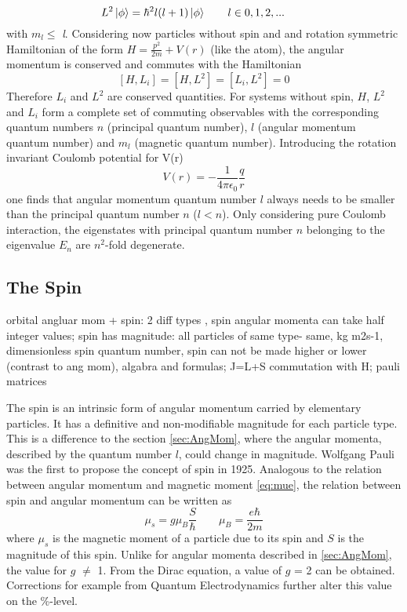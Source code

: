 \begin{equation}
\label{eq:l}
 L^{2}\ket{\phi}=\hbar^{2}l(l+1)\ket{\phi} \hspace{2em} l\in{0,1,2,...} \hspace{2em}
\end{equation} 
with \textbar\textit{$m_{l}$}\textbar $\leq$ \textit{l}. Considering now particles without spin and and rotation symmetric Hamiltonian of the form $H=\frac{p^{2}}{2m}+V(r)$ (like the atom), the angular momentum is conserved and commutes with the Hamiltonian
\begin{equation}
\label{eq:commutatorL3}
 [H,L_{i}]=[H,L^{2}]=[L_{i},L^{2}]=0
\end{equation} 
Therefore $L_{i}$ and $L^{2}$ are conserved quantities. For systems without spin, $H$, $L^{2}$ and $L_{i}$ form a complete set of commuting observables with the corresponding quantum numbers $n$ (principal quantum number), $l$ (angular momentum quantum number) and $m_{l}$ (magnetic quantum number). Introducing the rotation invariant Coulomb potential for V(r)
\begin{equation}
 V(r)=-\frac{1}{4\pi\epsilon_{0}}\frac{q}{r}
\end{equation} 
one finds that angular momentum quantum number $l$ always needs to be smaller than the principal quantum number $n$ ($l<n$). Only considering pure Coulomb interaction, the eigenstates with principal quantum number $n$ belonging to the eigenvalue $E_{n}$ are $n^{2}$-fold degenerate.
 
\subsection{The Spin}
\label{sec:Spin}

orbital angluar mom + spin: 2 diff types , spin angular momenta can take half integer values; spin has magnitude: all particles of same type- same, kg m2s-1, dimensionless spin quantum number, spin can not be made higher or lower (contrast to ang mom), algabra and formulas; J=L+S commutation with H; pauli matrices

The spin is an intrinsic form of angular momentum carried by elementary particles. It has a definitive and non-modifiable magnitude for each particle type. This is a difference to the section \ref{sec:AngMom}, where the angular momenta, described by the quantum number $l$, could change in magnitude. Wolfgang Pauli was the first to propose the concept of spin in 1925. Analogous to the relation between angular momentum and magnetic moment \ref{eq:mue}, the relation between spin and angular momentum can be written as
\begin{equation}
 \mu_{s} = g\mu_{B}\frac{S}{\hbar} \hspace{2em} \mu_{B} = \frac{e\hbar}{2m}
\end{equation} 
where $\mu_{s}$ is the magnetic moment of a particle due to its spin and $S$ is the magnitude of this spin. Unlike for angular momenta described in \ref{sec:AngMom}, the value for $g$ $\neq$ 1. From the Dirac equation, a value of $g$ = 2 can be obtained. Corrections for example from Quantum Electrodynamics further alter this value on the \%-level. 

